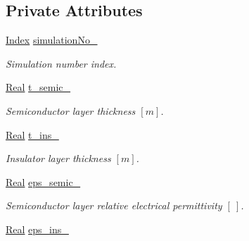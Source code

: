 \subsection*{Private Attributes}
\begin{DoxyCompactItemize}
\item 
\hypertarget{classParamList_a54962bcd38fdd7844045a1c93ce005fc}{\hyperlink{typedefs_8h_a2c726f8f32697958e9d6c2afecda531d}{Index} \hyperlink{classParamList_a54962bcd38fdd7844045a1c93ce005fc}{simulation\-No\-\_\-}}\label{classParamList_a54962bcd38fdd7844045a1c93ce005fc}

\begin{DoxyCompactList}\small\item\em Simulation number index. \end{DoxyCompactList}\item 
\hypertarget{classParamList_aeedc0268c6baa38b4821d85ad97d6f04}{\hyperlink{typedefs_8h_a060b837c3b4486ee35317744156f3da2}{Real} \hyperlink{classParamList_aeedc0268c6baa38b4821d85ad97d6f04}{t\-\_\-semic\-\_\-}}\label{classParamList_aeedc0268c6baa38b4821d85ad97d6f04}

\begin{DoxyCompactList}\small\item\em Semiconductor layer thickness $ \left[ m \right] $. \end{DoxyCompactList}\item 
\hypertarget{classParamList_a5a43783a68bb5ef04b797359a406fddf}{\hyperlink{typedefs_8h_a060b837c3b4486ee35317744156f3da2}{Real} \hyperlink{classParamList_a5a43783a68bb5ef04b797359a406fddf}{t\-\_\-ins\-\_\-}}\label{classParamList_a5a43783a68bb5ef04b797359a406fddf}

\begin{DoxyCompactList}\small\item\em Insulator layer thickness $ \left[ m \right] $. \end{DoxyCompactList}\item 
\hypertarget{classParamList_a1e07c6f98a0601cd91a3bf10a728f62a}{\hyperlink{typedefs_8h_a060b837c3b4486ee35317744156f3da2}{Real} \hyperlink{classParamList_a1e07c6f98a0601cd91a3bf10a728f62a}{eps\-\_\-semic\-\_\-}}\label{classParamList_a1e07c6f98a0601cd91a3bf10a728f62a}

\begin{DoxyCompactList}\small\item\em Semiconductor layer relative electrical permittivity $ \left[ ~ \right] $. \end{DoxyCompactList}\item 
\hypertarget{classParamList_a8955124ed7ee0cb116f343704478cac5}{\hyperlink{typedefs_8h_a060b837c3b4486ee35317744156f3da2}{Real} \hyperlink{classParamList_a8955124ed7ee0cb116f343704478cac5}{eps\-\_\-ins\-\_\-}}\label{classParamList_a8955124ed7ee0cb116f343704478cac5}


\end{DoxyCompactItemize}
